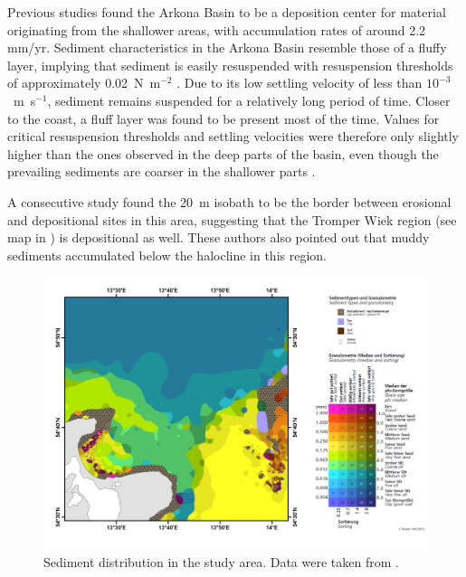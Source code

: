Previous studies \citep[][]{leipe2000, basys1} found the Arkona Basin to be a 
deposition center for material originating from the shallower areas, with 
accumulation rates of around 2.2 mm/yr. Sediment characteristics in the Arkona 
Basin resemble those of a fluffy layer, implying that sediment is easily 
resuspended with resuspension thresholds of approximately 0.02~N~m$^{-2}$ 
\citep[][determined with a LABEREX chamber from sediment core 
samples]{basys1}. %
Due to its low settling velocity of less than $10^{-3}$~m~s$^{-1}$, sediment 
remains suspended for a relatively long period of time. Closer to the coast, a 
fluff layer was found to be present most of the time. Values for critical 
resuspension thresholds and settling velocities were therefore only slightly 
higher than the ones observed in the deep parts of the basin, even though the 
prevailing sediments are coarser in the shallower parts \citep[][]{basys1}. %

A consecutive study \citep[][]{basys2} found the 20~m isobath to be the border 
between erosional and depositional sites in this area, suggesting that the 
Tromper Wiek region (see map in ) is depositional as well. These 
authors also pointed out that 
muddy sediments accumulated below the halocline in this region.

 \begin{figure}[ht]
\includegraphics[width=40pc]{bilder/TW.pdf}
 \caption{Sediment distribution in the study area. Data were taken from 
\cite{tauber2012}.}
 \label{tauberkarte}
 \end{figure}

